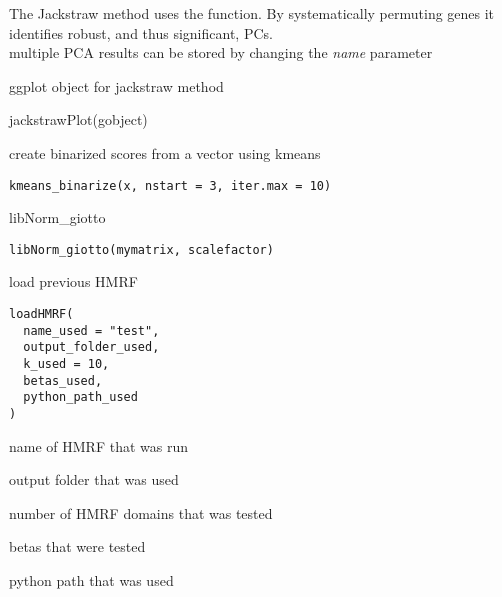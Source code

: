 \documentclass[a4paper]{book}
\begin{document}
%
\begin{Details}\relax
The Jackstraw method uses the  function. By
systematically permuting genes it identifies robust, and thus significant, PCs.
\\{} multiple PCA results can be stored by changing the \emph{name} parameter
\end{Details}
%
\begin{Value}
ggplot object for jackstraw method
\end{Value}
%
\begin{Examples}
\begin{ExampleCode}
    jackstrawPlot(gobject)
\end{ExampleCode}
\end{Examples}
%
\begin{Description}\relax
create binarized scores from a vector using kmeans
\end{Description}
%
\begin{Usage}
\begin{verbatim}
kmeans_binarize(x, nstart = 3, iter.max = 10)
\end{verbatim}
\end{Usage}
%
\begin{Description}\relax
libNorm\_giotto
\end{Description}
%
\begin{Usage}
\begin{verbatim}
libNorm_giotto(mymatrix, scalefactor)
\end{verbatim}
\end{Usage}
%
\begin{Description}\relax
load previous HMRF
\end{Description}
%
\begin{Usage}
\begin{verbatim}
loadHMRF(
  name_used = "test",
  output_folder_used,
  k_used = 10,
  betas_used,
  python_path_used
)
\end{verbatim}
\end{Usage}
%
\begin{Arguments}
\begin{ldescription}
\item[\code{name\_used}] name of HMRF that was run

\item[\code{output\_folder\_used}] output folder that was used

\item[\code{k\_used}] number of HMRF domains that was tested

\item[\code{betas\_used}] betas that were tested

\item[\code{python\_path\_used}] python path that was used
\end{ldescription}
\end{Arguments}
\end{document}
